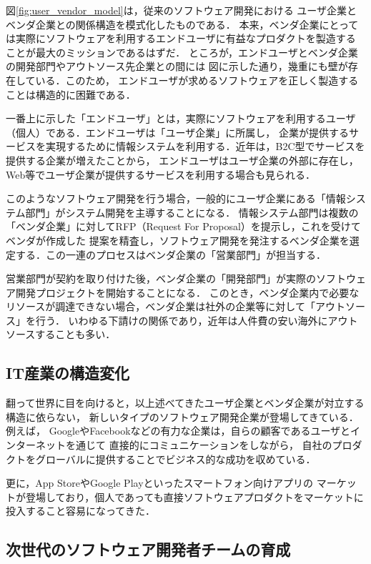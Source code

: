 \documentclass[a4j,9pt,twocolumn,twoside]{jsarticle}
\begin{document}
    図\ref{fig:user_vendor_model}は，従来のソフトウェア開発における
    ユーザ企業とベンダ企業との関係構造を模式化したものである．
    本来，ベンダ企業にとっては実際にソフトウェアを利用するエンドユーザに有益なプロダクトを製造する
    ことが最大のミッションであるはずだ．
    ところが，エンドユーザとベンダ企業の開発部門やアウトソース先企業との間には
    図に示した通り，幾重にも壁が存在している．このため，
    エンドユーザが求めるソフトウェアを正しく製造することは構造的に困難である．
    
    一番上に示した「エンドユーザ」とは，実際にソフトウェアを利用するユーザ（個人）である．エンドユーザは「ユーザ企業」に所属し，
    企業が提供するサービスを実現するために情報システムを利用する．近年は，B2C型でサービスを提供する企業が増えたことから，
    エンドユーザはユーザ企業の外部に存在し，Web等でユーザ企業が提供するサービスを利用する場合も見られる．
    
    このようなソフトウェア開発を行う場合，一般的にユーザ企業にある「情報システム部門」がシステム開発を主導することになる．
    情報システム部門は複数の「ベンダ企業」に対してRFP（Request For Proposal）を提示し，これを受けてベンダが作成した
    提案を精査し，ソフトウェア開発を発注するベンダ企業を選定する．この一連のプロセスはベンダ企業の「営業部門」が担当する．
    
    営業部門が契約を取り付けた後，ベンダ企業の「開発部門」が実際のソフトウェア開発プロジェクトを開始することになる．
    このとき，ベンダ企業内で必要なリソースが調達できない場合，ベンダ企業は社外の企業等に対して「アウトソース」を行う．
    いわゆる下請けの関係であり，近年は人件費の安い海外にアウトソースすることも多い．
    
    \subsection{IT産業の構造変化}

    翻って世界に目を向けると，以上述べてきたユーザ企業とベンダ企業が対立する構造に依らない，
    新しいタイプのソフトウェア開発企業が登場してきている．例えば，
    GoogleやFacebookなどの有力な企業は，自らの顧客であるユーザとインターネットを通じて
    直接的にコミュニケーションをしながら，
    自社のプロダクトをグローバルに提供することでビジネス的な成功を収めている．
    
    更に，App StoreやGoogle Playといったスマートフォン向けアプリの
    マーケットが登場しており，個人であっても直接ソフトウェアプロダクトをマーケットに投入すること容易になってきた．
    
	\subsection{次世代のソフトウェア開発者チームの育成}
\end{document}
